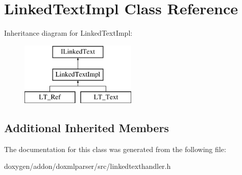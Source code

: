 \hypertarget{class_linked_text_impl}{}\section{Linked\+Text\+Impl Class Reference}
\label{class_linked_text_impl}
Inheritance diagram for Linked\+Text\+Impl\+:\begin{figure}[H]
\begin{center}
\leavevmode
\includegraphics[height=3.000000cm]{class_linked_text_impl}
\end{center}
\end{figure}
\subsection*{Additional Inherited Members}


The documentation for this class was generated from the following file\+:\begin{DoxyCompactItemize}
\item 
doxygen/addon/doxmlparser/src/linkedtexthandler.\+h\end{DoxyCompactItemize}
